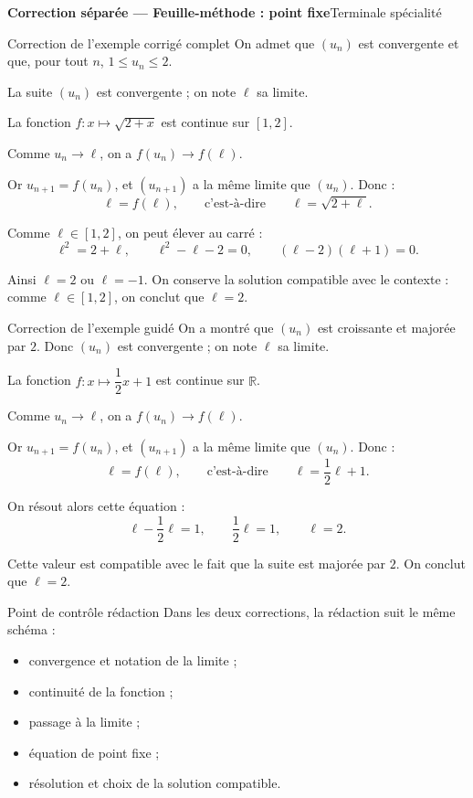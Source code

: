 \documentclass[10pt,a4paper]{article}
\begin{document}
\thispagestyle{empty}

{\large\bfseries Correction séparée --- Feuille-méthode : point fixe}\hfill {\small Terminale spécialité}

\begin{boite}{Correction de l'exemple corrigé complet}
On admet que \((u_n)\) est convergente et que, pour tout \(n\), \(1\leq u_n\leq2\).

La suite \((u_n)\) est convergente ; on note \(\ell\) sa limite.

La fonction \(f:x\mapsto \sqrt{2+x}\) est continue sur \([1,2]\).

Comme \(u_n\to \ell\), on a \(f(u_n)\to f(\ell)\).

Or \(u_{n+1}=f(u_n)\), et \((u_{n+1})\) a la même limite que \((u_n)\). Donc :
\[
\ell=f(\ell),\qquad \text{c'est-à-dire}\qquad \ell=\sqrt{2+\ell}.
\]

Comme \(\ell\in[1,2]\), on peut élever au carré :
\[
\ell^2=2+\ell,
\qquad
\ell^2-\ell-2=0,
\qquad
(\ell-2)(\ell+1)=0.
\]

Ainsi \(\ell=2\) ou \(\ell=-1\). On conserve la solution compatible avec le contexte : comme \(\ell\in[1,2]\), on conclut que \(\boxed{\ell=2}\).
\end{boite}

\begin{boite}{Correction de l'exemple guidé}
On a montré que \((u_n)\) est croissante et majorée par \(2\). Donc \((u_n)\) est convergente ; on note \(\ell\) sa limite.

La fonction \(f:x\mapsto \dfrac12x+1\) est continue sur \(\mathbb{R}\).

Comme \(u_n\to\ell\), on a \(f(u_n)\to f(\ell)\).

Or \(u_{n+1}=f(u_n)\), et \((u_{n+1})\) a la même limite que \((u_n)\). Donc :
\[
\ell=f(\ell),\qquad \text{c'est-à-dire}\qquad \ell=\frac12\ell+1.
\]

On résout alors cette équation :
\[
\ell-\frac12\ell=1,
\qquad
\frac12\ell=1,
\qquad
\ell=2.
\]

Cette valeur est compatible avec le fait que la suite est majorée par \(2\). On conclut que \(\boxed{\ell=2}\).
\end{boite}

\begin{boite}{Point de contrôle rédaction}
Dans les deux corrections, la rédaction suit le même schéma :

\begin{itemize}
  \item convergence et notation de la limite ;
  \item continuité de la fonction ;
  \item passage à la limite ;
  \item équation de point fixe ;
  \item résolution et choix de la solution compatible.
\end{itemize}
\end{boite}
\end{document}

